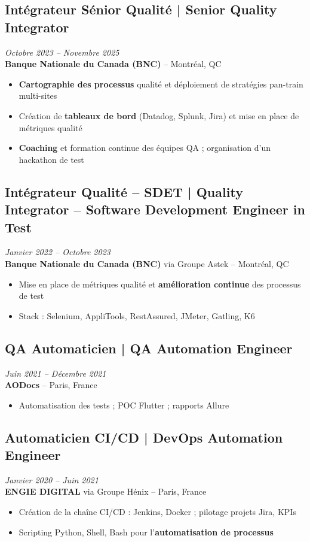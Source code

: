\documentclass[11pt,a4paper]{article}
\begin{document}
\subsection*{Intégrateur Sénior Qualité | Senior Quality Integrator} \hfill \textit{Octobre 2023 -- Novembre 2025}\\
\textbf{Banque Nationale du Canada (BNC)} -- Montréal, QC
\begin{itemize}
    \item \textbf{Cartographie des processus} qualité et déploiement de stratégies pan-train multi-sites
    \item Création de \textbf{tableaux de bord} (Datadog, Splunk, Jira) et mise en place de métriques qualité
    \item \textbf{Coaching} et formation continue des équipes QA ; organisation d'un hackathon de test
\end{itemize}

\subsection*{Intégrateur Qualité -- SDET | Quality Integrator -- Software Development Engineer in Test} \hfill \textit{Janvier 2022 -- Octobre 2023}\\
\textbf{Banque Nationale du Canada (BNC)} via Groupe Astek -- Montréal, QC
\begin{itemize}
    \item Mise en place de métriques qualité et \textbf{amélioration continue} des processus de test
    \item Stack : Selenium, AppliTools, RestAssured, JMeter, Gatling, K6
\end{itemize}

\subsection*{QA Automaticien | QA Automation Engineer} \hfill \textit{Juin 2021 -- Décembre 2021}\\
\textbf{AODocs} -- Paris, France
\begin{itemize}
    \item Automatisation des tests ; POC Flutter ; rapports Allure
\end{itemize}

\subsection*{Automaticien CI/CD | DevOps Automation Engineer} \hfill \textit{Janvier 2020 -- Juin 2021}\\
\textbf{ENGIE DIGITAL} via Groupe Hénix -- Paris, France
\begin{itemize}
    \item Création de la chaîne CI/CD : Jenkins, Docker ; pilotage projets Jira, KPIs
    \item Scripting Python, Shell, Bash pour l'\textbf{automatisation de processus}
\end{itemize}
\end{document}
